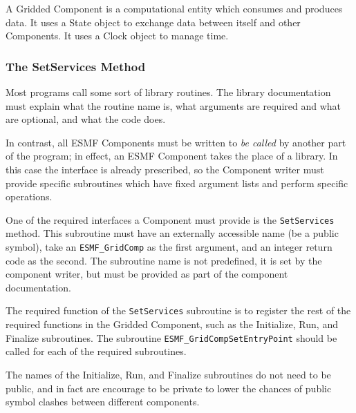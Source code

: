 %


A Gridded Component is a computational entity which
consumes and produces data.  It uses a State object to
exchange data between itself and other Components.  It 
uses a Clock object to manage time.

\subsubsection{The SetServices Method}

Most programs call some sort of library routines.  The library
documentation must explain what the routine name is, what arguments 
are required and what are optional, and what the code does.  

In contrast, all ESMF Components must be written to {\it be called}
by another part of the program; in effect, an ESMF Component takes the 
place of a library.  In this case the interface is already prescribed,
so the Component writer must provide specific subroutines which 
have fixed argument lists and perform specific operations.

One of the required interfaces a Component must provide is 
the {\tt SetServices} method.  This subroutine must have an
externally accessible name (be a public symbol), take an {\tt ESMF\_GridComp}
as the first argument, and an integer return code as the second.
The subroutine name is not predefined, it is set by the component
writer, but must be provided as part of the component documentation.

The required function of the {\tt SetServices} subroutine is to
register the rest of the required functions in the Gridded Component,
such as the Initialize, Run, and Finalize subroutines.  The subroutine
{\tt ESMF\_GridCompSetEntryPoint} should be called for
each of the required subroutines.  

The names of the Initialize, Run, and Finalize subroutines do not
need to be public, and in fact are encourage to be private to lower
the chances of public symbol clashes between different components.

